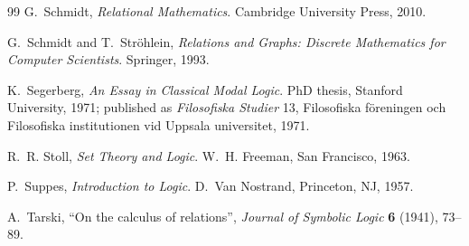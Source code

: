 \documentclass[11pt,a4paper,reqno]{amsart}
\theoremstyle{definition}
\theoremstyle{remark}
\begin{document}
\begin{thebibliography}{99}
G.~Schmidt,
\textit{Relational Mathematics}.
Cambridge University Press, 2010.

G.~Schmidt and T.~Str\"ohlein,
\textit{Relations and Graphs: Discrete Mathematics for Computer Scientists}.
Springer, 1993.

K.~Segerberg,
\textit{An Essay in Classical Modal Logic}.
PhD thesis, Stanford University, 1971; published as \textit{Filosofiska
Studier} 13, Filosofiska föreningen och Filosofiska institutionen vid Uppsala
universitet, 1971.

R.~R. Stoll,
\textit{Set Theory and Logic}.
W.~H. Freeman, San Francisco, 1963.

P.~Suppes,
\textit{Introduction to Logic}.
D.~Van Nostrand, Princeton, NJ, 1957.

A.~Tarski,
``On the calculus of relations'',
\textit{Journal of Symbolic Logic} \textbf{6} (1941), 73--89.

\end{thebibliography}
\end{document}
